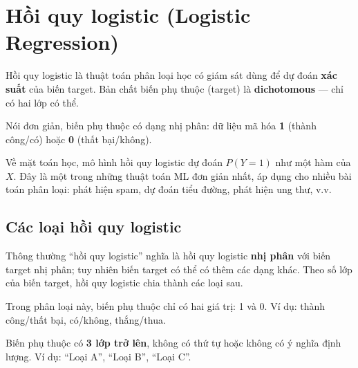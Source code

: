 \section{Hồi quy logistic (Logistic Regression)}
\label{sec:logistic-regression}

\begin{dinhnghia}[title={Giới thiệu hồi quy logistic}]
Hồi quy logistic là thuật toán phân loại học có giám sát dùng để dự đoán \textbf{xác suất} của biến target.
Bản chất biến phụ thuộc (target) là \textbf{dichotomous} --- chỉ có hai lớp có thể.
\end{dinhnghia}

\begin{ynghia}[title={Biến nhị phân}]
Nói đơn giản, biến phụ thuộc có dạng nhị phân: dữ liệu mã hóa \textbf{1} (thành công/có) hoặc \textbf{0} (thất bại/không).
\end{ynghia}

\begin{dinhnghia}[title={Mô hình xác suất}]
Về mặt toán học, mô hình hồi quy logistic dự đoán $P(Y=1)$ như một hàm của $X$.
Đây là một trong những thuật toán ML đơn giản nhất, áp dụng cho nhiều bài toán phân loại: phát hiện spam, dự đoán tiểu đường, phát hiện ung thư, v.v.
\end{dinhnghia}

\subsection{Các loại hồi quy logistic}

\begin{ynghia}[title={Phân loại theo số lớp}]
Thông thường ``hồi quy logistic'' nghĩa là hồi quy logistic \textbf{nhị phân} với biến target nhị phân; tuy nhiên biến target có thể có thêm các dạng khác.
Theo số lớp của biến target, hồi quy logistic chia thành các loại sau.
\end{ynghia}

\begin{dinhnghia}[title={Nhị phân (Binary hoặc Binomial)}]
Trong phân loại này, biến phụ thuộc chỉ có hai giá trị: 1 và 0.
Ví dụ: thành công/thất bại, có/không, thắng/thua.
\end{dinhnghia}

\begin{dinhnghia}[title={Đa thức (Multinomial)}]
Biến phụ thuộc có \textbf{3 lớp trở lên}, không có thứ tự hoặc không có ý nghĩa định lượng.
Ví dụ: ``Loại A'', ``Loại B'', ``Loại C''.
\end{dinhnghia}

